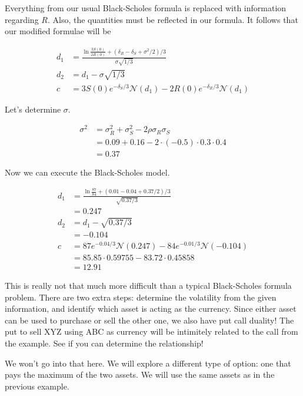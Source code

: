 \documentclass{ximera}
\begin{document}
\begin{solution}
Everything from our usual Black-Scholes formula is replaced with information regarding $R$. Also, the quantities must be reflected in our formula. It follows that our modified formulae will be

	\begin{align*}
	d_1 		&=\frac{\ln\frac{3S(0)}{2R(0)}+(\delta_R-\delta_S+\sigma^2/2)/3}{\sigma\sqrt{1/3}}\\
	d_2 		&=d_1-\sigma\sqrt{1/3}\\
	c 		&=3S(0)e^{-\delta_S/3}\mathcal{N}(d_1)-2R(0)e^{-\delta_R/3}\mathcal{N}(d_1)
	\end{align*}

Let's determine $\sigma$.

	\begin{align*}
	\sigma^2 	&=\sigma_R^2+\sigma_S^2-2\rho\sigma_R\sigma_S\\
			&=0.09+0.16-2\cdot (-0.5)\cdot 0.3\cdot 0.4\\
			&=0.37
	\end{align*}

Now we can execute the Black-Scholes model.

	\begin{align*}
	d_1 		&=\frac{\ln\frac{87}{84}+(0.01-0.04+0.37/2)/3}{\sqrt{0.37/3}}\\
			&=0.247\\
	d_2 		&=d_1-\sqrt{0.37/3}\\
			&=-0.104\\
	c 		&=87e^{-0.04/3}\mathcal{N}(0.247)-84e^{-0.01/3}\mathcal{N}(-0.104)\\
			&=85.85\cdot 0.59755-83.72\cdot 0.45858\\
			&=12.91
	\end{align*}
\end{solution}

This is really not that much more difficult than a typical Black-Scholes formula problem. There are two extra steps: determine the volatility from the given information, and identify which asset is acting as the currency. Since either asset can be used to purchase or sell the other one, we also have put call duality! The put to sell XYZ using ABC as currency will be intimitely related to the call from the example. See if you can determine the relationship!

We won't go into that here. We will explore a different type of option: one that pays the maximum of the two assets. We will use the same assets as in the previous example.
\end{document}
